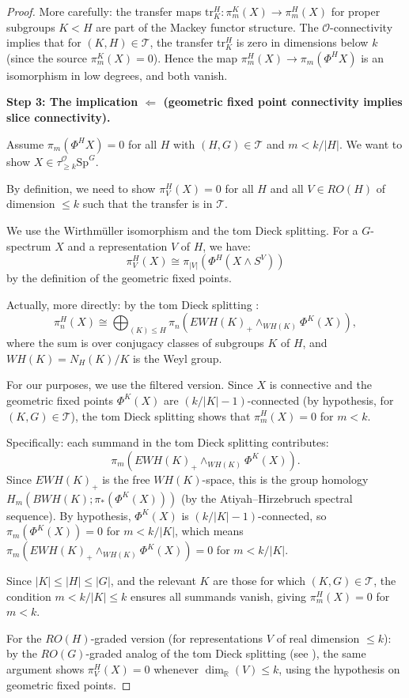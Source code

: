 \documentclass[12pt]{article}
\begin{document}
\begin{proof}
More carefully: the transfer maps $\mathrm{tr}_{K}^H: \pi_m^K(X) \to \pi_m^H(X)$ for proper subgroups $K < H$ are part of the Mackey functor structure. The $\mathcal{O}$-connectivity implies that for $(K, H) \in \mathcal{T}$, the transfer $\mathrm{tr}_K^H$ is zero in dimensions below $k$ (since the source $\pi_m^K(X) = 0$). Hence the map $\pi_m^H(X) \to \pi_m(\Phi^H X)$ is an isomorphism in low degrees, and both vanish.

\textbf{Step 3: The implication $\Leftarrow$ (geometric fixed point connectivity implies slice connectivity).}

Assume $\pi_m(\Phi^H X) = 0$ for all $H$ with $(H,G) \in \mathcal{T}$ and $m < k/|H|$. We want to show $X \in \tau_{\geq k}^{\mathcal{O}} \mathrm{Sp}^G$.

By definition, we need to show $\pi_V^H(X) = 0$ for all $H$ and all $V \in RO(H)$ of dimension $\leq k$ such that the transfer is in $\mathcal{T}$.

We use the Wirthm\"{u}ller isomorphism and the tom Dieck splitting. For a $G$-spectrum $X$ and a representation $V$ of $H$, we have:
\[
\pi_V^H(X) \cong \pi_{|V|}(\Phi^H(X \wedge S^V))
\]
by the definition of the geometric fixed points.

Actually, more directly: by the tom Dieck splitting \cite{tomDieck1975}:
\[
\pi_n^H(X) \cong \bigoplus_{(K) \leq H} \pi_n(EWH(K)_+ \wedge_{WH(K)} \Phi^K(X)),
\]
where the sum is over conjugacy classes of subgroups $K$ of $H$, and $WH(K) = N_H(K)/K$ is the Weyl group.

For our purposes, we use the filtered version. Since $X$ is connective and the geometric fixed points $\Phi^K(X)$ are $(k/|K| - 1)$-connected (by hypothesis, for $(K,G) \in \mathcal{T}$), the tom Dieck splitting shows that $\pi_m^H(X) = 0$ for $m < k$.

Specifically: each summand in the tom Dieck splitting contributes:
\[
\pi_m(EWH(K)_+ \wedge_{WH(K)} \Phi^K(X)).
\]
Since $EWH(K)_+$ is the free $WH(K)$-space, this is the group homology $H_m(BWH(K); \pi_*(\Phi^K(X)))$ (by the Atiyah--Hirzebruch spectral sequence). By hypothesis, $\Phi^K(X)$ is $(k/|K|-1)$-connected, so $\pi_m(\Phi^K(X)) = 0$ for $m < k/|K|$, which means $\pi_m(EWH(K)_+ \wedge_{WH(K)} \Phi^K(X)) = 0$ for $m < k/|K|$.

Since $|K| \leq |H| \leq |G|$, and the relevant $K$ are those for which $(K, G) \in \mathcal{T}$, the condition $m < k/|K| \leq k$ ensures all summands vanish, giving $\pi_m^H(X) = 0$ for $m < k$.

For the $RO(H)$-graded version (for representations $V$ of real dimension $\leq k$): by the $RO(G)$-graded analog of the tom Dieck splitting (see \cite{Lewis1988}), the same argument shows $\pi_V^H(X) = 0$ whenever $\dim_\mathbb{R}(V) \leq k$, using the hypothesis on geometric fixed points.


\end{proof}
\end{document}
